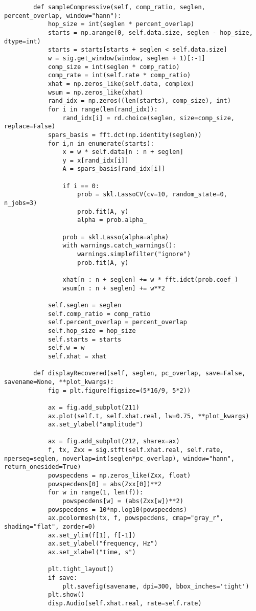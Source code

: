 \begin{lstlisting}
		def sampleCompressive(self, comp_ratio, seglen, percent_overlap, window="hann"):
			hop_size = int(seglen * percent_overlap)
			starts = np.arange(0, self.data.size, seglen - hop_size, dtype=int)
			starts = starts[starts + seglen < self.data.size]
			w = sig.get_window(window, seglen + 1)[:-1]
			comp_size = int(seglen * comp_ratio)
			comp_rate = int(self.rate * comp_ratio)
			xhat = np.zeros_like(self.data, complex)
			wsum = np.zeros_like(xhat)
			rand_idx = np.zeros((len(starts), comp_size), int)
			for i in range(len(rand_idx)):
				rand_idx[i] = rd.choice(seglen, size=comp_size, replace=False)
			spars_basis = fft.dct(np.identity(seglen))
			for i,n in enumerate(starts):
				x = w * self.data[n : n + seglen]
				y = x[rand_idx[i]]
				A = spars_basis[rand_idx[i]]
				
				if i == 0:
					prob = skl.LassoCV(cv=10, random_state=0, n_jobs=3)
					prob.fit(A, y)
					alpha = prob.alpha_
				
				prob = skl.Lasso(alpha=alpha)
				with warnings.catch_warnings():
					warnings.simplefilter("ignore")
					prob.fit(A, y)
				
				xhat[n : n + seglen] += w * fft.idct(prob.coef_)
				wsum[n : n + seglen] += w**2
			
			self.seglen = seglen
			self.comp_ratio = comp_ratio
			self.percent_overlap = percent_overlap
			self.hop_size = hop_size
			self.starts = starts
			self.w = w
			self.xhat = xhat
		
		def displayRecovered(self, seglen, pc_overlap, save=False, savename=None, **plot_kwargs):
			fig = plt.figure(figsize=(5*16/9, 5*2))
			
			ax = fig.add_subplot(211)
			ax.plot(self.t, self.xhat.real, lw=0.75, **plot_kwargs)
			ax.set_ylabel("amplitude")
			
			ax = fig.add_subplot(212, sharex=ax)
			f, tx, Zxx = sig.stft(self.xhat.real, self.rate, nperseg=seglen, noverlap=int(seglen*pc_overlap), window="hann", return_onesided=True)
			powspecdens = np.zeros_like(Zxx, float)
			powspecdens[0] = abs(Zxx[0])**2
			for w in range(1, len(f)):
				powspecdens[w] = (abs(Zxx[w])**2)
			powspecdens = 10*np.log10(powspecdens)
			ax.pcolormesh(tx, f, powspecdens, cmap="gray_r", shading="flat", zorder=0)
			ax.set_ylim(f[1], f[-1])
			ax.set_ylabel("frequency, Hz")
			ax.set_xlabel("time, s")
			
			plt.tight_layout()
			if save:
				plt.savefig(savename, dpi=300, bbox_inches='tight')
			plt.show()
			disp.Audio(self.xhat.real, rate=self.rate)
\end{lstlisting}